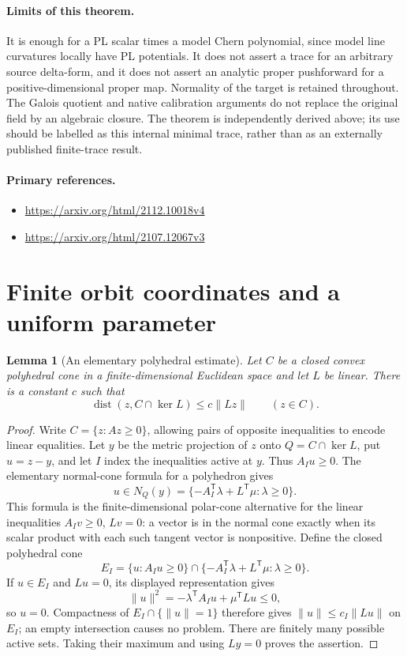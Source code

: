 \documentclass[11pt,a4paper]{article}
\newtheorem{lemma}[theorem]{Lemma}
\theoremstyle{definition}
\theoremstyle{remark}
\newcommand{\dist}{\operatorname{dist}}
\begin{document}
\paragraph*{Limits of this theorem.}
It is enough for a PL scalar times a model Chern polynomial, since
model line curvatures locally have PL potentials.  It does not assert
a trace for an arbitrary source delta-form, and it does not assert
an analytic proper pushforward for a positive-dimensional proper map.
Normality of the target is retained throughout.  The Galois quotient
and native calibration arguments do not replace the original field
by an algebraic closure.  The theorem is independently derived above;
its use should be labelled as this internal minimal trace, rather than
as an externally published finite-trace result.

\paragraph*{Primary references.}
\begin{itemize}
\item \url{https://arxiv.org/html/2112.10018v4}
\item \url{https://arxiv.org/html/2107.12067v3}
\end{itemize}


\section{Finite orbit coordinates and a uniform parameter}

\begin{lemma}[An elementary polyhedral estimate]\label{h22:hoffman}
Let $C$ be a closed convex polyhedral cone in a finite-dimensional
Euclidean space and let $L$ be linear. There is a constant $c$ such that
\[
 \dist(z,C\cap\ker L)\leq c\|Lz\|\qquad(z\in C).
\]
\end{lemma}
\begin{proof}
Write $C=\{z:Az\geq0\}$, allowing pairs of opposite inequalities to
encode linear equalities. Let $y$ be the metric projection of $z$ onto
$Q=C\cap\ker L$, put $u=z-y$, and let $I$ index the inequalities active
at $y$. Thus $A_Iu\geq0$. The elementary normal-cone formula for a
polyhedron gives
\[
 u\in N_Q(y)=\{-A_I^{\mathsf T}\lambda+L^{\mathsf T}\mu:
                                  \lambda\geq0\}.
\]
This formula is the finite-dimensional polar-cone alternative for the
linear inequalities $A_Iv\geq0$, $Lv=0$: a vector is in the normal cone
exactly when its scalar product with each such tangent vector is
nonpositive. Define the closed polyhedral cone
\[
 E_I=\{u:A_Iu\geq0\}\cap
     \{-A_I^{\mathsf T}\lambda+L^{\mathsf T}\mu:\lambda\geq0\}.
\]
If $u\in E_I$ and $Lu=0$, its displayed representation gives
\[
 \|u\|^2=-\lambda^{\mathsf T}A_Iu+\mu^{\mathsf T}Lu\leq0,
\]
so $u=0$. Compactness of $E_I\cap\{\|u\|=1\}$ therefore gives
$\|u\|\leq c_I\|Lu\|$ on $E_I$; an empty intersection causes no
problem. There are finitely many possible active sets. Taking their
maximum and using $Ly=0$ proves the assertion.
\end{proof}
\end{document}
